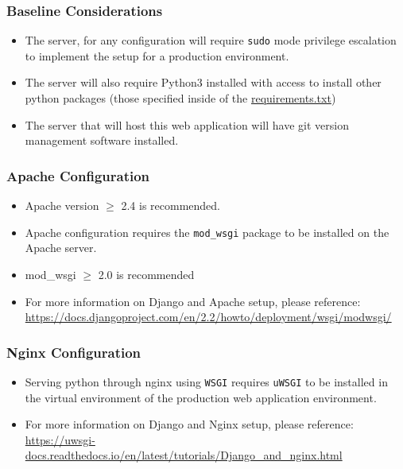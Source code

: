 \documentclass[11pt, hidelinks, letterpaper, obeyspaces]{article}
\begin{document}
\subsubsection{Baseline Considerations}
\begin{itemize}
  \item The server, for any configuration will require \verb!sudo! mode privilege
    escalation to implement the setup for a production environment.
  \item The server will also require Python3 installed with access to install other
    python packages (those specified inside of the
    \hyperref[sec:requirements.txt]{\url{requirements.txt}})
  \item The server that will host this web application will have git version
    management software installed.
\end{itemize}
\subsubsection{Apache Configuration}
\begin{itemize}
  \item Apache version $\geq$ 2.4 is recommended.
  \item Apache configuration requires the \verb!mod_wsgi! package to be installed on the
    Apache server.
  \item mod\_wsgi $\geq$ 2.0 is recommended
  \item For more information on Django and Apache setup, please reference:
    \href{https://docs.djangoproject.com/en/2.2/howto/deployment/wsgi/modwsgi/}
    {\url{https://docs.djangoproject.com/en/2.2/howto/deployment/wsgi/modwsgi/}}
\end{itemize}
\subsubsection{Nginx Configuration}
\begin{itemize}
  \item Serving python through nginx using \verb!WSGI! requires \verb!uWSGI! to
    be installed in the virtual environment of the production web application
    environment.
  \item For more information on Django and Nginx setup, please reference:
      \href{https://uwsgi-docs.readthedocs.io/en/latest/tutorials/Django_and_nginx.html}
      {\url{https://uwsgi-docs.readthedocs.io/en/latest/tutorials/Django_and_nginx.html}} 

\end{itemize}
\newpage
\appendix
\end{document}
